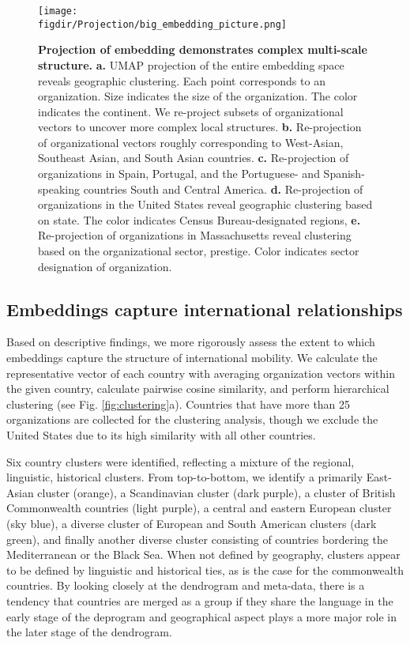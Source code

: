 \documentclass[12pt]{article} %
\def\figdir{../Figs}
\begin{document}
\begin{figure}[hp!]
    \centering
    \label{fig:projection}
    \texttt{[image: \\figdir/Projection/big\_embedding\_picture.png]}
    \caption{
        \textbf{Projection of embedding demonstrates complex multi-scale structure.}
        \textbf{a.}
        UMAP projection \autocite{mcinnes2018umap} of the entire embedding space reveals geographic clustering.
        Each point corresponds to an organization.
        Size indicates the size of the organization.
        The color indicates the continent.
        We re-project subsets of organizational vectors to uncover more complex local structures.
        \textbf{b.} Re-projection of organizational vectors roughly corresponding to West-Asian, Southeast Asian, and South Asian countries.
        \textbf{c.} Re-projection of organizations in Spain, Portugal, and the Portuguese- and Spanish-speaking countries South and Central America.
        \textbf{d.} Re-projection of organizations in the United States reveal geographic clustering based on state.
        The color indicates Census Bureau-designated regions,
        \textbf{e.} Re-projection of organizations in Massachusetts reveal clustering based on the organizational sector, prestige.
        Color indicates sector designation of organization.
    }
\end{figure}


\subsection*{Embeddings capture international relationships}

Based on descriptive findings, we more rigorously assess the extent to which embeddings capture the structure of international mobility.
We calculate the representative vector of each country with averaging organization vectors within the given country, calculate pairwise cosine similarity, and perform hierarchical clustering (see Fig. \ref{fig:clustering}a).
Countries that have more than 25 organizations are collected for the clustering analysis, though we exclude the United States due to its high similarity with all other countries.

Six country clusters were identified, reflecting a mixture of the regional, linguistic, historical clusters.
From top-to-bottom, we identify a primarily East-Asian cluster (orange), a Scandinavian cluster (dark purple), a cluster of British Commonwealth countries (light purple), a central and eastern European cluster (sky blue), a diverse cluster of European and South American clusters (dark green), and finally another diverse cluster consisting of countries bordering the Mediterranean or the Black Sea.
When not defined by geography, clusters appear to be defined by linguistic and historical ties, as is the case for the commonwealth countries.
By looking closely at the dendrogram and meta-data, there is a tendency that countries are merged as a group if they share the language in the early stage of the deprogram and geographical aspect plays a more major role in the later stage of the dendrogram.
\end{document}
